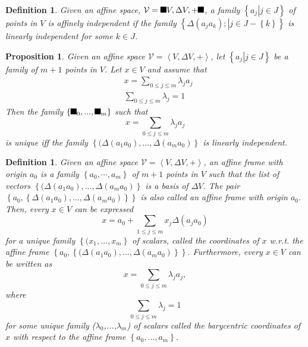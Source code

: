 \documentclass[aps,preprint]{revtex4}%
\providecommand{\U}[1]{\protect\rule{.1in}{.1in}}
\newtheorem{definition}[theorem]{Definition}
\newtheorem{proposition}[theorem]{Proposition}
\begin{document}
\begin{definition}
Given an affine space, $\mathcal{V}=\U{3008} V,\Delta V,+\U{3009} $, a family
$\left\{  \left.  a_{j}\right\vert j\in J\right\}  $ of points in $V$ is
\emph{affinely independent} if the family $\left\{  \left.  \Delta\left(
a_{j}a_{k}\right)  ;\right\vert j\in J-\left\{  k\right\}  \right\}  $ is
linearly independent for some $k\in J$.
\end{definition}

\begin{proposition}
Given an affine space $\mathcal{V}=\left\langle V,\Delta V,+\right\rangle $,
let $\left\{  \left.  a_{j}\right\vert j\in J\right\}  $ be a family of $m+1$
points in $V$. Let $x\in V$ and assume that
\begin{align}
&  x=\sum_{0\leq j\leq m}\lambda_{j}a_{j}\\
&  \sum_{0\leq j\leq m}\lambda_{j}=1
\end{align}
Then the family $\left\{  \U{3bb} _{0},...,\U{3bb} _{m}\right\}  $ such that%
\begin{equation}
x=\sum_{0\leq j\leq m}\lambda_{j}a_{j}%
\end{equation}
is \emph{unique iff the family} $\left\{  (\Delta\left(  a_{1}a_{0}\right)
,...,\Delta\left(  a_{m}a_{0}\right)  \right\}  $ \emph{is linearly
independent.}
\end{proposition}

\begin{definition}
Given an affine space $\mathcal{V}=\left\langle V,\Delta V,+\right\rangle $,
an \emph{affine frame} \emph{with origin} $a_{0}$ is a family $\left\{
a_{0},\cdots,a_{m}\right\}  $ of $m+1$ points in $V$ such that the list of
vectors $\left\{  (\Delta\left(  a_{1}a_{0}\right)  ,...,\Delta\left(
a_{m}a_{0}\right)  \right\}  $ is a basis of $\Delta V$. The pair $\left\{
a_{0},\left\{  \Delta\left(  a_{1}a_{0}\right)  ,...,\Delta\left(  a_{m}%
a_{0}\right)  \right\}  \right\}  $ is also called an \emph{affine frame}
\emph{with origin} $a_{0}$. \emph{Then, every }$x\in V$\emph{ can be
expressed}
\begin{equation}
x=a_{0}+\sum_{1\leq j\leq m}x_{j}\Delta\left(  a_{j}a_{0}\right)
\end{equation}
for a unique family $\left\{  (x_{1},...,x_{m}\right\}  $ of scalars, called
the coordinates of $x$ w.r.t. the affine frame $\left\{  a_{0},\left\{
(\Delta\left(  a_{1}a_{0}\right)  ,...,\Delta\left(  a_{m}a_{0}\right)
\right\}  \right\}  $. Furthermore, every $x\in V$ can be written as%
\begin{equation}
x=\sum_{0\leq j\leq m}\lambda_{j}a_{j},
\end{equation}
where
\begin{equation}
\sum_{0\leq j\leq m}\lambda_{j}=1
\end{equation}
for some unique family ($\lambda_{0}$,...,$\lambda_{m}$) of scalars called the
\emph{barycentric coordinates} of $x$ with respect to the affine frame
$\left\{  a_{0},...,a_{m}\right\}  $.
\end{definition}
\end{document}

